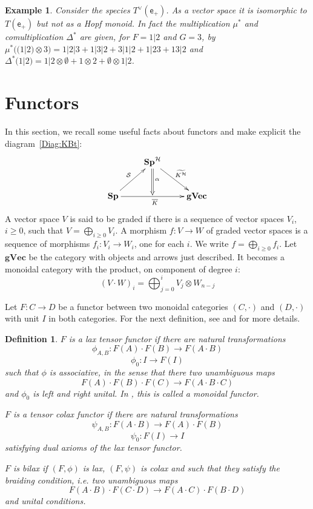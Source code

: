 \documentclass[11pt,reqno]{amsart}
\numberwithin{equation}{section}
\newtheorem{ex}[theorem]{Example}
\newtheorem{definition}[theorem]{Definition}
\def\S{{\mathbb S}}
\def\Sp{{\mathbf{Sp}}}
\def\SpB{{\mathbf{Sp}^{\H}}}
\def\gVec{{\mathbf{gVec}}}
\def\H{{\mathcal{H}}}
\def\exp{{\textsf{e}}}
\def\S{{\mathcal{S}}}
\def\Kb{\overline{K}}
\def\KBt{\widetilde{K^{\H}}}
\begin{document}
\begin{ex}
Consider the species $T^{\vee}(\exp_+)$. As a vector space it is isomorphic to $T(\exp_+)$ but not as a Hopf monoid. In fact the multiplication $\mu^{\ast}$ and comultiplication $\Delta^{\ast}$ are given, for $F=1|2$ and $G=3$, by $\mu^{\ast}((1|2)\otimes 3)=1|2|3+1|3|2+3|1|2+ 1|23 + 13|2$ and $\Delta^{\ast}(1|2)=1|2\otimes \emptyset + 1\otimes 2+ \emptyset\otimes 1|2$.


\end{ex}



\section{Functors}\label{Sec:functors}
In this section, we recall some useful facts about functors and make explicit the diagram~\ref{Diag:KBt}:
\begin{equation*}
\xymatrix{ & \SpB \ar[dr]^{\KBt} \ar@{=>}[d]^{\alpha} \\ \Sp \ar[rr]_{\Kb} \ar[ur]^{\S} & & \gVec}
\end{equation*}
A vector space $V$ is said to be graded if there is a sequence of vector spaces $V_i$, $i\geq 0$, such that $V=\bigoplus_{i\geq 0} V_i$. A morphism $f\colon V\rightarrow W$ of graded vector spaces is a sequence of morphisms $f_i\colon V_i\rightarrow W_i$, one for each $i$. We write $f=\bigoplus_{i\geq 0} f_i$. Let $\gVec$ be the category with objects and arrows just described. It becomes a monoidal category with the product, on component of degree $i$:
$$(V\cdot W)_i = \bigoplus_{j=0}^i V_j\otimes W_{n-j}$$


Let $F\colon C\rightarrow D$ be a functor between two monoidal categories $(C,\cdot)$ and $(D,\cdot)$ with unit $I$ in both categories. For the next definition, see \cite{Mac} and \cite{Aguiar} for more details.
\begin{definition}
$F$ is a lax tensor functor if there are natural transformations
$$\phi_{A,B}:F(A)\cdot F(B) \rightarrow F(A\cdot B)$$
$$\phi_0:I\rightarrow F(I)$$
such that $\phi$ is associative, in the sense that there two unambiguous maps
$$F(A)\cdot F(B)\cdot F(C) \rightarrow F(A\cdot B\cdot C)$$
and $\phi_0$ is left and right unital. In \cite{Mac}, this is called a monoidal functor.


$F$ is a tensor colax functor if there are natural transformations
$$\psi_{A,B}:F(A\cdot B) \rightarrow F(A)\cdot F(B)$$
$$\psi_0:F(I)\rightarrow I$$
satisfying dual axioms of the lax tensor functor.

$F$ is bilax if $(F,\phi)$ is lax, $(F,\psi)$ is colax and such that they satisfy the braiding condition, i.e. two unambiguous maps 
$$F(A\cdot B)\cdot F(C\cdot D)\rightarrow F(A\cdot C)\cdot F(B\cdot D)$$
and unital conditions.
\end{definition}
\end{document}

